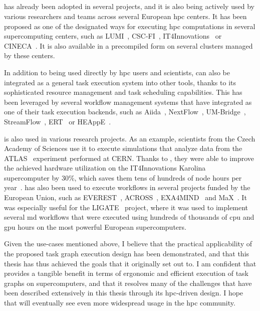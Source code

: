 \subsection*{\hyperqueue{}}
\hyperqueue{} has already been adopted in several projects, and it is also being
actively used by various researchers and teams across several European \gls{hpc}
centers. It has been proposed as one of the designated ways for executing
\gls{hpc} computations in several supercomputing centers, such as
LUMI~\cite{it4i-lumi}, CSC-FI~\cite{puhti-hq,puhti-hq-2},
IT4Innovations~\cite{it4i-hq} or CINECA~\cite{cineca}. It is also
available in a precompiled form on several clusters managed by these centers.

In addition to being used directly by \gls{hpc} users and scientists,
\hyperqueue{} can also be integrated as a general task execution system into other
tools, thanks to its sophisticated resource management and task scheduling capabilities. This has
been leveraged by several workflow management systems that have integrated
\hyperqueue{} as one of their task execution backends, such as
Aiida~\cite{aiida-hq}, NextFlow~\cite{nextflow-hq},
UM-Bridge~\cite{umbridge}, StreamFlow~\cite{streamflow-hq},
ERT~\cite{ert} or HEAppE~\cite{heappe}.

\hyperqueue{} is also used in various research projects. As an example,
scientists from the Czech Academy of Sciences use it to execute simulations that analyze data from
the ATLAS~\cite{atlas} experiment performed at CERN. Thanks to
\hyperqueue{}, they were able to improve the achieved hardware utilization on the
IT4Innovations Karolina~\cite{karolina} supercomputer by 30\%, which saves them tens of
hundreds of node hours per year~\cite{cern-hq}. \hyperqueue{} has also
been used to execute workflows in several projects funded by the European Union, such as
EVEREST~\cite{everest}, ACROSS~\cite{across},
EXA4MIND~\cite{exa4mind} and MaX~\cite{max}. It was especially useful
for the LIGATE~\cite{ligate} project, where it was used to implement several
\gls{md} workflows that were executed using hundreds of thousands of
\gls{cpu} and \gls{gpu} hours on the most powerful European
supercomputers.

Given the use-cases mentioned above, I believe that the practical applicability of the proposed
task graph execution design has been demonstrated, and that this thesis has thus achieved the goals
that it originally set out to. I am confident that \hyperqueue{} provides a tangible
benefit in terms of ergonomic and efficient execution of task graphs on supercomputers, and that it
resolves many of the challenges that have been described extensively in this thesis through its
\gls{hpc}-driven design. I hope that \hyperqueue{} will eventually
see even more widespread usage in the \gls{hpc} community.
